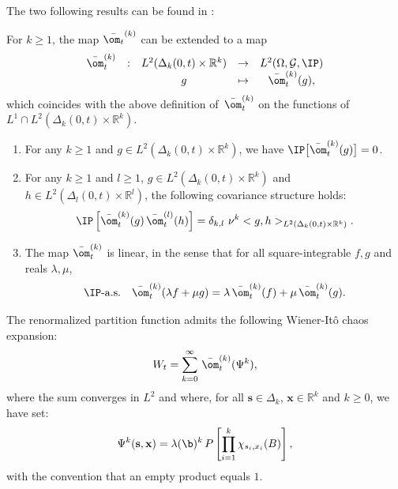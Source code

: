 The two following results can be found in \cite{LastPenrose}:
\begin{proposition}
For $k\geq 1$, the map $\bar{\om_t}^{(k)}$ can be extended to a map \[\begin{array}{ccccc}
\bar{\om}_t^{(k)} & : & L^2(\Delta_k(0,t)\times \mathbb{R}^k) & \to & L^2(\Omega,\mathcal{G},\IP)\\
& & g &\mapsto & \bar{\om}_t^{(k)}(g),
\end{array} \] which coincides with the above definition of $\,\bar{\om}_t^{(k)}$ on the functions of $L^1 \cap L^2(\Delta_k(0,t)\times \mathbb{R}^k)$.
\end{proposition}
\begin{property}
\begin{enumerate}[label=(\roman*)]
\item For any $k\geq 1$ and $g\in L^2(\Delta_k(0,t)\times \mathbb{R}^k)$, we have $\IP\big[\bar{\om}_t^{(k)} (g)\big] = 0$.
\item For any $k\geq 1$ and $l\geq 1$, $g\in L^2(\Delta_k(0,t)\times \mathbb{R}^k)$ and $h\in L^2(\Delta_l(0,t)\times \mathbb{R}^l)$, the following covariance structure holds:
\begin{equation} \label{eq:covariance_structure}
\IP\left[\bar{\om}_t^{(k)}(g) \, \bar{\om}_t^{(l)}(h) \right] = \delta_{k,l} \ \nu^k < g ,h >_{L^2(\Delta_k(0,t)\times \mathbb{R}^k)}.
\end{equation}
\item The map $\bar{\om}_t^{(k)}$ is linear, in the sense that for all square-integrable $f,g$ and reals $\lambda,\mu$,
\begin{equation*}
\IP \text{-a.s.} \quad \bar{\om}_t^{(k)}(\lambda f + \mu g) = \lambda \, \bar{\om}_t^{(k)}(f) + \mu \,\bar{\om}_t^{(k)}(g).
\end{equation*}
\end{enumerate}
\end{property} 
\begin{proposition} \textup{\cite{CoscoIntermediate}} \label{prop:Poisson_chaos_decomposition}
The renormalized partition function admits the following Wiener-It\^o chaos expansion:
\begin{equation} \label{eq:wiener_ito_wt_expansion}
W_t = \sum_{k=0}^\infty \, \bar{\om}^{(k)}_t (\Psi^k),
\end{equation} where the sum converges in $L^2$ and where, for all $\mathbf{s}\in \Delta_k$, $\mathbf{x}\in\mathbb{R}^k$ and $k\geq 0$, we have set:
\begin{equation} \label{eq:TkWtExpression}
\Psi^k(\mathbf{s},\mathbf{x}) = \lambda(\b)^k\, P\left[\prod_{i=1}^k \chi_{s_i,x_i}(B) \right],
\end{equation}
with the convention that an empty product equals $1$.
\end{proposition}

